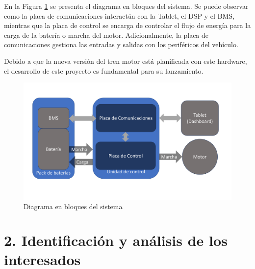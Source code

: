 \documentclass[
11pt, %
codirector, %
]{charter}
\begin{document}


En la Figura \ref{fig:diagBloques} se presenta el diagrama en bloques del sistema. Se puede observar como la placa de comunicaciones interactúa con la Tablet, el DSP y el BMS, mientras que la placa de control se encarga de controlar el flujo de energía para la carga de la batería o marcha del motor. Adicionalmente, la placa de comunicaciones gestiona las entradas y salidas con los periféricos del vehículo.

Debido a que la nueva versión del tren motor está planificada con este hardware, el desarrollo de este proyecto es fundamental para su lanzamiento.

\begin{figure}[htpb]
	\centering
	\includegraphics[width=.9\textwidth]{./Figuras/EsquematicoPT.pdf}
	\caption{Diagrama en bloques del sistema}
	\label{fig:diagBloques}
\end{figure}

\vspace{25px}

\section{2. Identificación y análisis de los interesados}
\label{sec:interesados}
\end{document}
